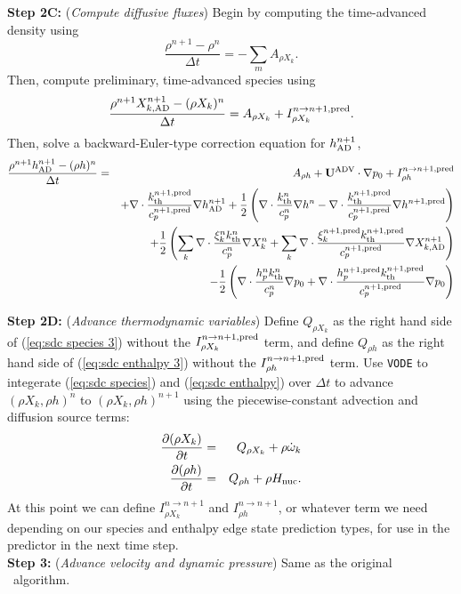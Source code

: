 {\bf Step 2C:} ({\it Compute diffusive fluxes}) Begin by computing the time-advanced density using
\begin{equation}
\frac{\rho^{n+1} - \rho^n}{\Delta t} = -\sum_mA_{\rho X_k}.
\end{equation}
Then, compute preliminary, time-advanced species using
\begin{equation}
\frac{\rho^{n+1}X_{k,{\rm AD}}^{n+1} - (\rho X_k)^n}{\Delta t} = A_{\rho X_k} + I_{\rho X_k}^{n\rightarrow n+1,{\rm pred}}.\label{eq:sdc species 3}
\end{equation}
Then, solve a backward-Euler-type correction equation for $h^{n+1}_{\rm AD}$,
\begin{eqnarray}
\frac{\rho^{n+1}h^{n+1}_{\rm AD} - (\rho h)^n}{\Delta t} &=& A_{\rho h} + \mathbf{U}^{\mathrm{ADV}}\cdot\nabla p_0 + I_{\rho h}^{n\rightarrow n+1,{\rm pred}}\nonumber\\
&& + \nabla\cdot\frac{k_{\rm th}^{n+1,{\rm pred}}}{c_p^{n+1,{\rm pred}}}\nabla h^{n+1}_{\rm AD} + \frac{1}{2}\left(\nabla\cdot\frac{k_{\rm th}^n}{c_p^n}\nabla h^n - \nabla\cdot\frac{k_{\rm th}^{n+1,{\rm pred}}}{c_p^{n+1,{\rm pred}}}\nabla h^{n+1,{\rm pred}}\right)\nonumber\\
&& + \frac{1}{2}\left(\sum_k\nabla\cdot\frac{\xi_k^n k_{\rm th}^n}{c_p^n}\nabla X_k^n + \sum_k\nabla\cdot\frac{\xi_k^{n+1,{\rm pred}} k_{\rm th}^{n+1,{\rm pred}}}{c_p^{n+1,{\rm pred}}}\nabla X_{k,{\rm AD}}^{n+1}\right)\nonumber\\
&& - \frac{1}{2}\left(\nabla\cdot\frac{h_p^n k_{\rm th}^n}{c_p^n}\nabla p_0 + \nabla\cdot\frac{h_p^{n+1,{\rm pred}}k_{\rm th}^{n+1,{\rm pred}}}{c_p^{n+1,{\rm pred}}}\nabla p_0\right)\label{eq:sdc enthalpy 3}
\end{eqnarray}

{\bf Step 2D:} ({\it Advance thermodynamic variables}) Define $Q_{\rho X_k}$ as the right hand side of (\ref{eq:sdc species 3}) without the $I_{\rho X_k}^{n\rightarrow n+1,{\rm pred}}$ term, and define $Q_{\rho h}$ as the right hand side of (\ref{eq:sdc enthalpy 3}) without the $I_{\rho h}^{n\rightarrow n+1,{\rm pred}}$ term.  Use {\tt VODE} to integerate (\ref{eq:sdc species}) and (\ref{eq:sdc enthalpy}) over $\Delta t$ to advance $(\rho X_k, \rho h)^n$ to $(\rho X_k, \rho h)^{n+1}$ using the piecewise-constant advection and diffusion source terms:
\begin{eqnarray}
\frac{\partial(\rho X_k)}{\partial t} &=& Q_{\rho X_k} + \rho\dot\omega_k\\
\frac{\partial(\rho h)}{\partial t} &=& Q_{\rho h} + \rho{H_{\rm nuc}}.
\end{eqnarray}
At this point we can define $I_{\rho X_k}^{n\rightarrow n+1}$ and $I_{\rho h}^{n\rightarrow n+1}$, or whatever term we need depending on our species and enthalpy edge state prediction types, for use in the predictor in the next time step.\\

{\bf Step 3:} ({\it Advance velocity and dynamic pressure}) Same as the original \maestro\ algorithm.
